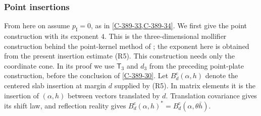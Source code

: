 \documentclass[11pt,letterpaper,reqno]{amsart}
\theoremstyle{definition}
\theoremstyle{remark}
\begin{document}
\subsubsection{Point insertions}

From here on assume $p_{\mathrm I}=0$, as in
\cref{C-389-33,C-389-34}. We first give the point
construction with its exponent $4$.
This is the three-dimensional mollifier construction behind the
point-kernel method of \cite[Lem.~8.28]{YMM1}; the exponent here is
obtained from the present insertion estimate (R5).
This construction needs only the coordinate cone. In its proof
we use $\mathsf T_3$ and $d_3$ from the preceding point-plate
construction, before the conclusion of \cref{C-389-30}.
Let $B_d^{\mathrm c}(\alpha,h)$ denote the centered slab insertion
at margin $d$ supplied by (R5). In matrix elements it is the
insertion of $(\alpha,h)$ between vectors translated by $d$.
Translation covariance gives its shift law, and reflection
reality gives
$B_d^{\mathrm c}(\alpha,h)^*=B_d^{\mathrm c}(\alpha,\theta\bar h)$.
\end{document}
